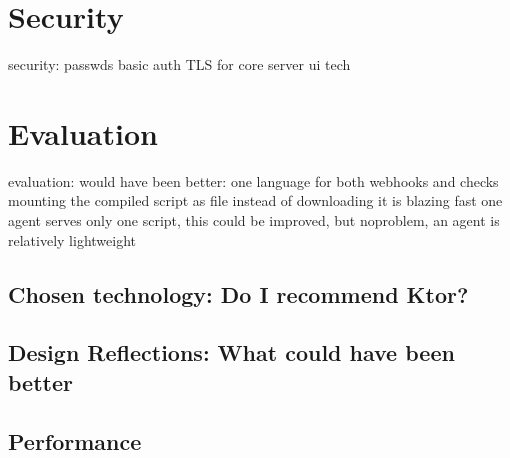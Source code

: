 \section{Security}
security:
    passwds
        basic auth
    TLS for core server 
ui tech


\section{Evaluation}

evaluation:
    would have been better: 
        one language for both webhooks and checks
        mounting the compiled script as file instead of downloading
    it is blazing fast
    one agent serves only one script, this could be improved, but noproblem, an agent is relatively lightweight

\subsection[Chosen technology]{Chosen technology: Do I recommend Ktor?}

\subsection[Design Reflections]{Design Reflections: What could have been better}

\subsection{Performance}



